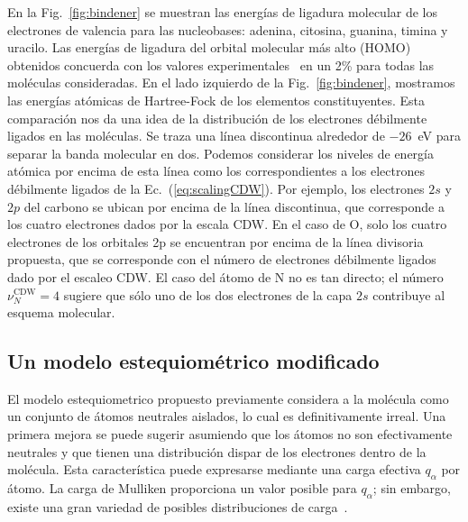 En la Fig.~\ref{fig:bindener} se muestran las energías de ligadura 
molecular de los electrones de valencia para las nucleobases: adenina, 
citosina, guanina, timina y uracilo. Las energías de ligadura del orbital 
molecular más alto (HOMO) obtenidos concuerda con los valores
experimentales~\cite{Hush,Verkin,Dougherty} en un 2\% para todas las 
moléculas consideradas. En el lado izquierdo de la Fig.~\ref{fig:bindener}, 
mostramos las energías atómicas de Hartree-Fock de los elementos 
constituyentes. Esta comparación nos da una idea de la distribución de 
los electrones débilmente ligados en las moléculas. Se traza una línea 
discontinua alrededor de $-26$~eV para separar la banda molecular en dos. 
Podemos considerar los niveles de energía atómica por encima de esta 
línea como los correspondientes a los electrones débilmente ligados de la 
Ec.~(\ref{eq:scalingCDW}). Por ejemplo, los electrones $2s$ y $2p$ del 
carbono se ubican por encima de la línea discontinua, que corresponde a 
los cuatro electrones dados por la escala CDW. En el caso de O, solo los
cuatro electrones de los orbitales 2p se encuentran por encima de la 
línea divisoria propuesta, que se corresponde con el número de electrones
débilmente ligados dado por el escaleo CDW. El caso del átomo de N no es 
tan directo; el número $\nu_{N}^{\text{CDW}}=4$ sugiere que sólo uno de 
los dos electrones de la capa $2s$ contribuye al esquema molecular.

\subsection{Un modelo estequiométrico modificado}

El modelo estequiometrico propuesto previamente considera a la molécula 
como un conjunto de átomos neutrales aislados, lo cual es definitivamente 
irreal. Una primera mejora se puede sugerir asumiendo que los átomos no 
son efectivamente neutrales y que tienen una distribución dispar de los 
electrones dentro de la molécula. Esta característica puede expresarse 
mediante una carga efectiva $q_{\alpha}$ por átomo. La carga de Mulliken 
proporciona un valor posible para $q_{\alpha}$; sin embargo, existe una 
gran variedad de posibles distribuciones de carga~\cite{lee2003}.

